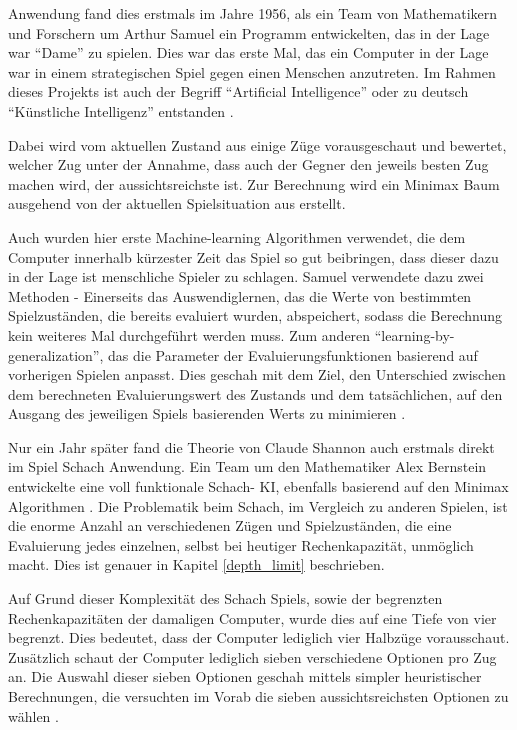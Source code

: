 
Anwendung fand dies erstmals im Jahre 1956, als ein Team von Mathematikern und Forschern um Arthur Samuel ein Programm entwickelten, das in der Lage war ``Dame'' zu spielen. Dies war das erste Mal, das ein Computer in der Lage war in einem strategischen Spiel gegen einen Menschen anzutreten. Im Rahmen dieses Projekts ist auch der Begriff ``Artificial Intelligence'' oder zu deutsch ``Künstliche Intelligenz'' entstanden \cite{Kurenkov2019}.

Dabei wird vom aktuellen Zustand aus einige Züge vorausgeschaut und bewertet, welcher Zug unter der Annahme, dass auch der Gegner den jeweils besten Zug machen wird, der aussichtsreichste ist. Zur Berechnung wird ein Minimax Baum ausgehend von der aktuellen Spielsituation aus erstellt.


Auch wurden hier erste Machine-learning Algorithmen verwendet, die dem Computer innerhalb kürzester Zeit das Spiel so gut beibringen, dass dieser dazu in der Lage ist menschliche Spieler zu schlagen. Samuel verwendete dazu zwei Methoden - Einerseits  das Auswendiglernen, das die Werte von bestimmten Spielzuständen, die bereits evaluiert wurden, abspeichert, sodass die Berechnung kein weiteres Mal durchgeführt werden muss. Zum anderen ``learning-by-generalization'', das die Parameter der Evaluierungsfunktionen basierend auf vorherigen Spielen anpasst. Dies geschah mit dem Ziel, den Unterschied zwischen dem berechneten Evaluierungswert des Zustands und dem tatsächlichen, auf den Ausgang des jeweiligen Spiels basierenden Werts zu minimieren \cite{Samuel1959}.


Nur ein Jahr später fand die Theorie von Claude Shannon auch erstmals direkt im Spiel Schach Anwendung. Ein Team um den Mathematiker Alex Bernstein entwickelte eine voll funktionale Schach- KI, ebenfalls basierend auf den Minimax Algorithmen \cite{Kurenkov2019}. Die Problematik beim Schach, im Vergleich zu anderen Spielen, ist die enorme Anzahl an verschiedenen Zügen und Spielzuständen, die eine Evaluierung jedes einzelnen, selbst bei heutiger Rechenkapazität, unmöglich macht. Dies ist genauer in Kapitel \ref{depth_limit} beschrieben. 

Auf Grund dieser Komplexität des Schach Spiels, sowie der begrenzten Rechenkapazitäten der damaligen Computer, wurde dies auf eine Tiefe von vier begrenzt. Dies bedeutet, dass der Computer lediglich vier Halbzüge vorausschaut. Zusätzlich schaut der Computer lediglich sieben verschiedene Optionen pro Zug an. Die Auswahl dieser sieben Optionen geschah mittels simpler heuristischer Berechnungen, die versuchten im Vorab die sieben aussichtsreichsten Optionen zu wählen \cite{Bernstein1958}.

